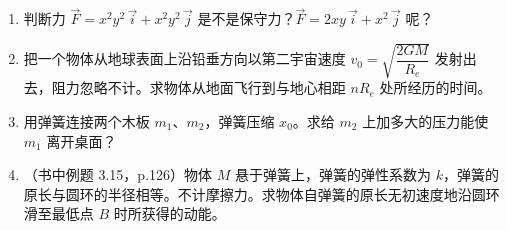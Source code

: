 \documentclass{ctexart}
\begin{document}
\begin{enumerate}
\item 判断力 $\vec{F} = x^{2}y^{2}\,\vec{i} + x^{2}y^{2}\,\vec{j}$ 是不是保守力？$\vec{F} = 2xy\,\vec{i} + x^{2}\,\vec{j}$ 呢？

\item 把一个物体从地球表面上沿铅垂方向以第二宇宙速度 $v_0 = \sqrt{\dfrac{2GM}{R_e}}$ 发射出去，阻力忽略不计。求物体从地面飞行到与地心相距 $nR_e$ 处所经历的时间。

\item 用弹簧连接两个木板 $m_1$、$m_2$，弹簧压缩 $x_0$。求给 $m_2$ 上加多大的压力能使 $m_1$ 离开桌面？

\item（书中例题 3.15，p.126）物体 $M$ 悬于弹簧上，弹簧的弹性系数为 $k$，弹簧的原长与圆环的半径相等。不计摩擦力。求物体自弹簧的原长无初速度地沿圆环滑至最低点 $B$ 时所获得的动能。

\end{enumerate}
\end{document}

